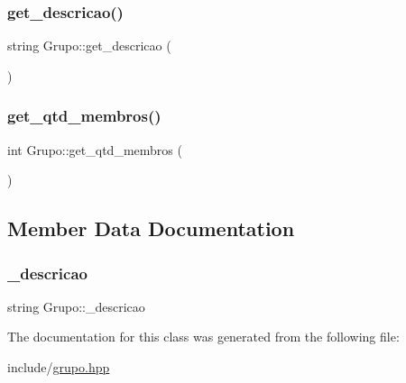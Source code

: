 \mbox{\label{classGrupo_a750990ef2e00c1c56558aeacab25d5a9}} 
\subsubsection{\texorpdfstring{get\+\_\+descricao()}{get\_descricao()}}
{\footnotesize\ttfamily string Grupo\+::get\+\_\+descricao (\begin{DoxyParamCaption}{ }\end{DoxyParamCaption})}

\mbox{\label{classGrupo_a9d93d76de63fb7b7faca9e7c1d1c607a}} 
\subsubsection{\texorpdfstring{get\+\_\+qtd\+\_\+membros()}{get\_qtd\_membros()}}
{\footnotesize\ttfamily int Grupo\+::get\+\_\+qtd\+\_\+membros (\begin{DoxyParamCaption}{ }\end{DoxyParamCaption})}



\subsection{Member Data Documentation}
\mbox{\label{classGrupo_a8f3c802c33537298ddbbc8b11bcea2f3}} 
\subsubsection{\texorpdfstring{\+\_\+descricao}{\_descricao}}
{\footnotesize\ttfamily string Grupo\+::\+\_\+descricao\hspace{0.3cm}{\ttfamily [private]}}



The documentation for this class was generated from the following file\+:\begin{DoxyCompactItemize}
\item 
include/\hyperlink{grupo_8hpp}{grupo.\+hpp}\end{DoxyCompactItemize}
